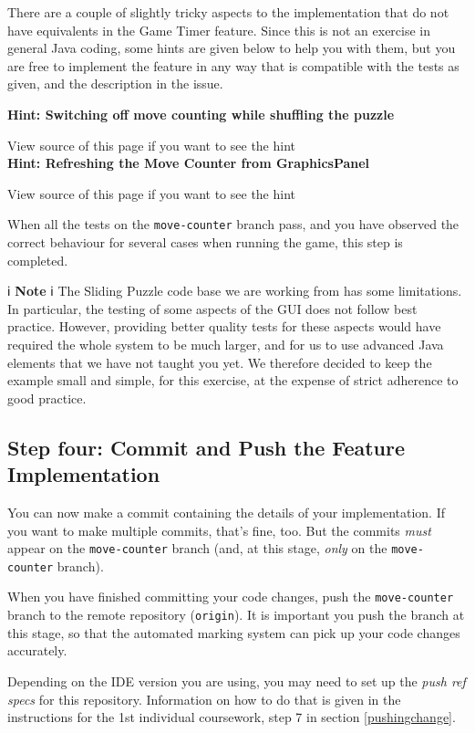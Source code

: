 \documentclass[
]{book}
\begin{document}
There are a couple of slightly tricky aspects to the implementation that do not have equivalents in the Game Timer feature. Since this is not an exercise in general Java coding, some hints are given below to help you with them, but you are free to implement the feature in any way that is compatible with the tests as given, and the description in the issue.

\textbf{Hint: Switching off move counting while shuffling the puzzle}

View source of this page if you want to see the hint\\

\textbf{Hint: Refreshing the Move Counter from GraphicsPanel}

View source of this page if you want to see the hint

When all the tests on the \texttt{move-counter} branch pass, and you have observed the correct behaviour for several cases when running the game, this step is completed.

ℹ️ \textbf{Note} ℹ️
The Sliding Puzzle code base we are working from has some limitations. In particular, the testing of some aspects of the GUI does not follow best practice. However, providing better quality tests for these aspects would have required the whole system to be much larger, and for us to use advanced Java elements that we have not taught you yet. We therefore decided to keep the example small and simple, for this exercise, at the expense of strict adherence to good practice.

\hypertarget{featimp}{%
\subsection{Step four: Commit and Push the Feature Implementation}\label{featimp}}

You can now make a commit containing the details of your implementation. If you want to make multiple commits, that's fine, too. But the commits \emph{must} appear on the \texttt{move-counter} branch (and, at this stage, \emph{only} on the \texttt{move-counter} branch).

When you have finished committing your code changes, push the \texttt{move-counter} branch to the remote repository (\texttt{origin}). It is important you push the branch at this stage, so that the automated marking system can pick up your code changes accurately.

Depending on the IDE version you are using, you may need to set up the \emph{push ref specs} for this repository. Information on how to do that is given in the instructions for the 1st individual coursework, step 7 in section \ref{pushingchange}.
\end{document}
